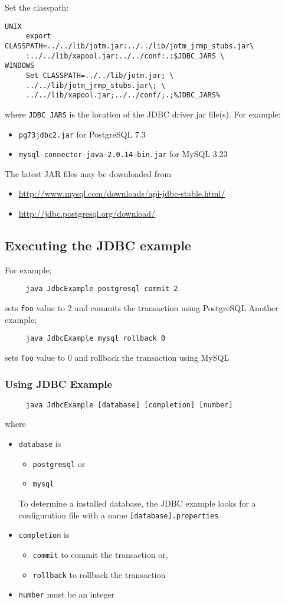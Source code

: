 \documentclass[a4paper,11pt]{article}
\begin{document}
\noindent Set the classpath:
\begin{verbatim}
UNIX 
     export CLASSPATH=../../lib/jotm.jar:../../lib/jotm_jrmp_stubs.jar\
     :../../lib/xapool.jar:../../conf:.:$JDBC_JARS \
WINDOWS 
     Set CLASSPATH=../../lib/jotm.jar; \
     ../../lib/jotm_jrmp_stubs.jar\; \
     ../../lib/xapool.jar;../../conf/;.;%JDBC_JARS% 
\end{verbatim}
where \texttt{JDBC\_JARS} is the location of the JDBC driver jar
file(s). For example:
\begin{itemize}
\item \texttt{pg73jdbc2.jar} for PostgreSQL 7.3
\item \texttt{mysql-connector-java-2.0.14-bin.jar} for MySQL 3.23
\end{itemize}
The latest JAR files may be downloaded from
\begin{itemize}
\item \url{http://www.mysql.com/downloads/api-jdbc-stable.html/}
\item \url{http://jdbc.postgresql.org/download/}
\end{itemize}

\subsection{Executing the JDBC example}
\label{sec:jdbc_exec}
\noindent For example;
\begin{verbatim}
     java JdbcExample postgresql commit 2
\end{verbatim}
\noindent sets \texttt{foo} value to 2 and commits the transaction using
PostgreSQL
\noindent Another example;
\begin{verbatim}
     java JdbcExample mysql rollback 0
\end{verbatim}
sets \texttt{foo} value to 0 and rollback the transaction using MySQL

\subsubsection{Using JDBC Example}
\begin{verbatim}
     java JdbcExample [database] [completion] [number]
\end{verbatim}
where
\begin{itemize}
\item \texttt{database} is
  \begin{itemize}
  \item \texttt{postgresql} or
  \item \texttt{mysql} 
\end{itemize}
\noindent To determine a installed database, the JDBC example looks
 for a configuration file with a name \texttt{[database].properties}
  
\item \texttt{completion} is
  \begin{itemize}
  \item \texttt{commit} to commit the transaction or,
  \item \texttt{rollback} to rollback the transaction
  \end{itemize}
\item \texttt{number} must be an integer
\end{itemize}
\end{document}
